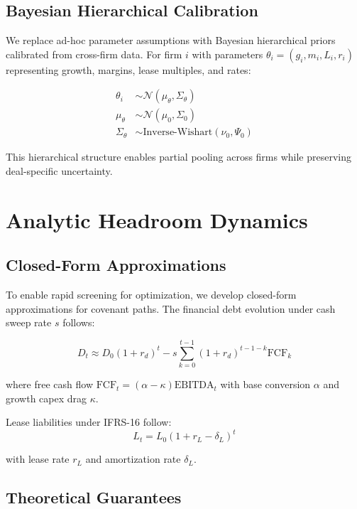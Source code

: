 \documentclass[11pt,a4paper]{article}
\begin{document}
\subsection{Bayesian Hierarchical Calibration}

We replace ad-hoc parameter assumptions with Bayesian hierarchical priors calibrated from cross-firm data. For firm $i$ with parameters $\theta_i = (g_i, m_i, L_i, r_i)$ representing growth, margins, lease multiples, and rates:

\begin{align}
\theta_i &\sim \mathcal{N}(\mu_{\theta}, \Sigma_{\theta}) \\
\mu_{\theta} &\sim \mathcal{N}(\mu_0, \Sigma_0) \\
\Sigma_{\theta} &\sim \text{Inverse-Wishart}(\nu_0, \Psi_0)
\end{align}

This hierarchical structure enables partial pooling across firms while preserving deal-specific uncertainty.

\section{Analytic Headroom Dynamics}

\subsection{Closed-Form Approximations}

To enable rapid screening for optimization, we develop closed-form approximations for covenant paths. The financial debt evolution under cash sweep rate $s$ follows:

\begin{equation}
D_t \approx D_0(1+r_d)^t - s \sum_{k=0}^{t-1} (1+r_d)^{t-1-k} \text{FCF}_k
\end{equation}

where free cash flow $\text{FCF}_t = (\alpha - \kappa) \text{EBITDA}_t$ with base conversion $\alpha$ and growth capex drag $\kappa$.

Lease liabilities under IFRS-16 follow:
\begin{equation}
L_t = L_0 (1 + r_L - \delta_L)^t
\end{equation}

with lease rate $r_L$ and amortization rate $\delta_L$.

\subsection{Theoretical Guarantees}
\end{document}
